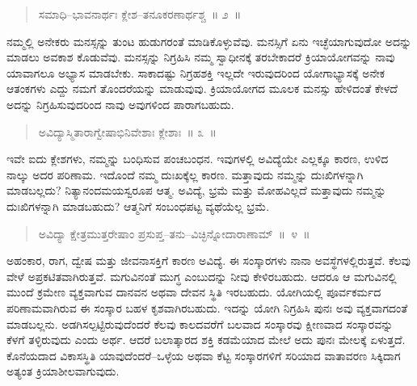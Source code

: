 \vspace{-0.15cm}

\begin{verse}
ಸಮಾಧಿ–ಭಾವನಾರ್ಥಃ ಕ್ಲೇಶ–ತನೂಕರಣಾರ್ಥಶ್ಚ~॥ ೨~॥
\end{verse}

\vspace{-0.4cm}


\vspace{0.15cm}

ನಮ್ಮಲ್ಲಿ ಅನೇಕರು ಮನಸ್ಸನ್ನು ತುಂಟ ಹುಡುಗರಂತೆ ಮಾಡಿಕೊಳ್ಳುವೆವು. ಮನಸ್ಸಿಗೆ ಏನು ಇಚ್ಛೆಯಾಗುವುದೋ ಅದನ್ನು ಮಾಡಲು ಅವಕಾಶ ಕೊಡುವೆವು. ಮನಸ್ಸನ್ನು ನಿಗ್ರಹಿಸಿ ನಮ್ಮ ಸ್ವಾಧೀನಕ್ಕೆ ತರಬೇಕಾದರೆ ಕ್ರಿಯಾಯೋಗವನ್ನು ನಾವು ಯಾವಾಗಲೂ ಅಭ್ಯಾಸ ಮಾಡಬೇಕು. ಸಾಕಾದಷ್ಟು ನಿಗ್ರಹಶಕ್ತಿ ಇಲ್ಲದೇ ಇರುವುದರಿಂದ ಯೋಗಾಭ್ಯಾಸಕ್ಕೆ ಅನೇಕ ಆತಂಕಗಳು ಎದ್ದು ನಮಗೆ ತೊಂದರೆಯನ್ನು ಮಾಡುವುವು. ಕ್ರಿಯಾಯೋಗದ ಮೂಲಕ ಮನಸ್ಸು ಹೇಳಿದಂತೆ ಕೇಳದೆ ಅದನ್ನು ನಿಗ್ರಹಿಸುವುದರಿಂದ ನಾವು ಅವುಗಳಿಂದ ಪಾರಾಗಬಹುದು. 

\vspace{-0.2cm}

\begin{verse}
ಅವಿದ್ಯಾಸ್ಮಿತಾರಾಗ್ವೇಷಾಭಿನಿವೇಶಾಃ ಕ್ಲೇಶಾಃ~॥ ೩~॥
\end{verse}

\vspace{-0.4cm}


\vskip 0.2cm

ಇವೇ ಐದು ಕ್ಲೇಶಗಳು, ನಮ್ಮನ್ನು ಬಂಧಿಸುವ ಪಂಚಬಂಧನ. ಇವುಗಳಲ್ಲಿ ಅವಿದ್ಯೆಯೇ ಎಲ್ಲಕ್ಕೂ ಕಾರಣ, ಉಳಿದ ನಾಲ್ಕು ಅದರ ಪರಿಣಾಮ. ಇದೊಂದೆ ನಮ್ಮ ದುಃಖಕ್ಕೆಲ್ಲ ಕಾರಣ. ಮತ್ತಾವುದು ನಮ್ಮನ್ನು ದುಃಖಿಗಳನ್ನಾಗಿ ಮಾಡಬಲ್ಲದು? ನಿತ್ಯಾನಂದಮಯಸ್ವರೂಪ ಆತ್ಮ. ಅವಿದ್ಯೆ, ಭ್ರಮೆ ಮತ್ತು ಮೋಹವಿಲ್ಲದೆ ಮತ್ತಾವುದು ನಮ್ಮನ್ನು ದುಃಖಿಗಳನ್ನಾಗಿ ಮಾಡಬಹುದು? ಆತ್ಮನಿಗೆ ಸಂಬಂಧಪಟ್ಟ ವ್ಯಥೆಯೆಲ್ಲ ಭ್ರಮೆ. 

\vspace{-0.2cm}

\begin{verse}
ಅವಿದ್ಯಾ ಕ್ಷೇತ್ರಮುತ್ತರೇಷಾಂ ಪ್ರಸುಪ್ತ–ತನು–ವಿಚ್ಛಿನ್ನೋದಾರಾಣಾಮ್​~॥~೪~॥
\end{verse}

\vspace{-0.4cm}


\vskip 0.2cm

ಅಹಂಕಾರ, ರಾಗ, ದ್ವೇಷ ಮತ್ತು ಜೀವನಾಸಕ್ತಿಗೆ ಕಾರಣ ಅವಿದ್ಯೆ. ಈ ಸಂಸ್ಕಾರಗಳು ನಾನಾ ಅವಸ್ಥೆಗಳಲ್ಲಿರುತ್ತವೆ. ಕೆಲವು ವೇಳೆ ಅಪ್ರಕಟಿತವಾಗಿರುತ್ತವೆ. ಮಗುವಿನಂತೆ ಮುಗ್ಧ ಎಂಬುದನ್ನು ನೀವು ಕೇಳಿರಬಹುದು. ಆದರೂ ಆ ಮಗುವಿನಲ್ಲಿ ಮುಂದೆ ಕ್ರಮೇಣ ವ್ಯಕ್ತವಾಗುವ ದಾನವನ ಅಥವಾ ದೇವನ ಸ್ಥಿತಿ ಇರಬಹುದು. ಯೋಗಿಯಲ್ಲಿ ಪೂರ್ವಕರ್ಮದ ಪರಿಣಾಮವಾಗಿರುವ ಈ ಸಂಸ್ಕಾರ ಬಹಳ ಕೃಶವಾಗಿರಬಹುದು. ಇದನ್ನು ಯೋಗಿ ನಿಗ್ರಹಿಸಿ ಪುನಃ ಅವು ವ್ಯಕ್ತವಾಗದಂತೆ ಮಾಡಬಲ್ಲನು. ಅಡಗಿಸಲ್ಪಟ್ಟಿರುವುದೆಂದರೆ ಕೆಲವು ಕಾಲದವರೆಗೆ ಬಲವಾದ ಸಂಸ್ಕಾರವು ಕ್ಷೀಣವಾದ ಸಂಸ್ಕಾರವನ್ನು ಕೆಳಗೆ ತಳ್ಳಿರುವುದು ಎಂದು ಅರ್ಥ. ಆದರೆ ಬಲಾತ್ಕಾರದ ಶಕ್ತಿ ಕಡಮೆಯಾದ ಮೇಲೆ ಅದು ಪುನಃ ಮೇಲಕ್ಕೆ ಏಳುತ್ತದೆ. ಕೊನೆಯದಾದ ವಿಕಾಸಸ್ಥಿತಿ ಯಾವುದೆಂದರೆ–ಒಳ್ಳೆಯ ಅಥವಾ ಕೆಟ್ಟ ಸಂಸ್ಕಾರಗಳಿಗೆ ಸರಿಯಾದ ವಾತಾವರಣ ಸಿಕ್ಕಿದಾಗ ಅತ್ಯಂತ ಕ್ರಿಯಾಶೀಲವಾಗುವುದು. 

